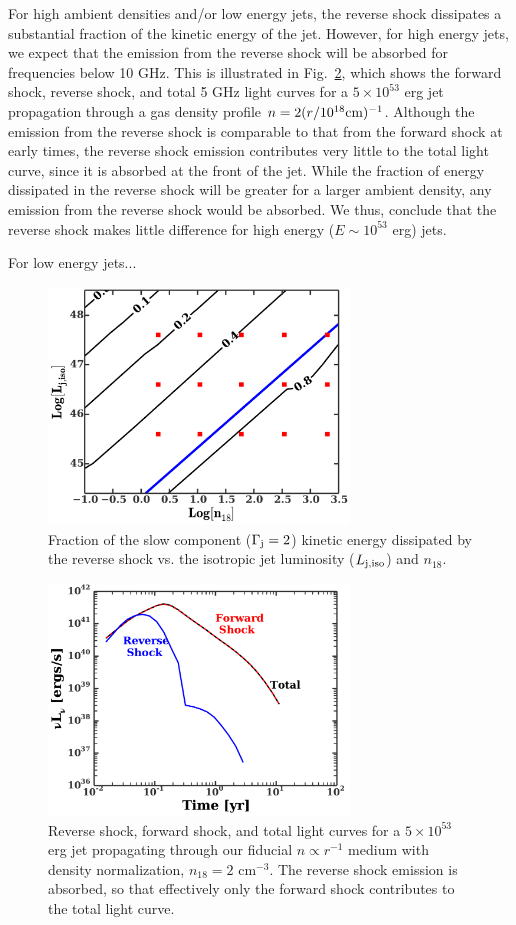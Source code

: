 \documentclass[usenatbib,fleqn]{mnras}
\begin{document}
For high ambient densities and/or low energy jets, the reverse shock
dissipates a substantial fraction of the kinetic energy of the
jet. However, for high energy jets, we expect that the emission from
the reverse shock will be absorbed for frequencies below 10 GHz.  This
is illustrated in Fig.~\ref{fig:reverse}, which shows the forward
shock, reverse shock, and total 5 GHz light curves for a $5\times
10^{53}$ erg jet propagation through a gas density profile $n = 2
(r/10^{18} {\rm cm})^{-1}$. Although the emission from the reverse
shock is comparable to that from the forward shock at early times, the
reverse shock emission contributes very little to the total light
curve, since it is absorbed at the front of the jet. While the
fraction of energy dissipated in the reverse shock will be greater for
a larger ambient density, any emission from the reverse shock would be
absorbed. We thus, conclude that the reverse shock makes little
difference for high energy ($E\sim 10^{53}$ erg) jets.

For low energy jets...

\begin{figure}
\includegraphics[width=8cm]{diss.pdf}
\caption{\label{fig:diss} Fraction of the slow component
  ($\Gamma_{\rm j}=2$) kinetic energy dissipated by the reverse shock
  vs. the isotropic jet luminosity ($L_{\rm j,iso}$) and $n_{18}$.}
\end{figure}

\begin{figure}
  \includegraphics[width=8cm]{reverse.pdf}
  \caption{\label{fig:reverse} Reverse shock, forward shock, and total
    light curves for a $5\times 10^{53}$ erg jet propagating through
    our fiducial $n\propto r^{-1}$ medium with density normalization,
    $n_{18}=2$ cm$^{-3}$. The reverse shock emission is absorbed, so
    that effectively only the forward shock contributes to the total
    light curve.}
\end{figure}
\end{document}
